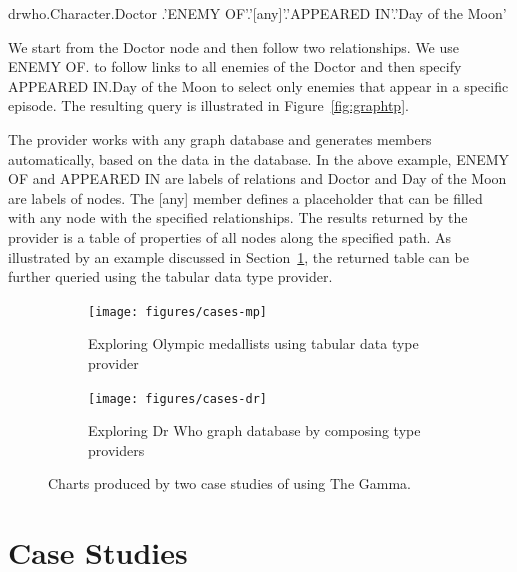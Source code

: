 \documentclass[manuscript,review,anonymous]{acmart}
\newcommand{\ikvd}[1]{{\fontfamily{zi4}\selectfont\small #1}}
\begin{document}
\begin{thegamma}
drwho.Character.Doctor
  .'ENEMY OF'.'[any]'.'APPEARED IN'.'Day of the Moon'
\end{thegamma}

\noindent
We start from the \ikvd{Doctor} node and then follow two relationships. We use
\ikvd{\textquotesingle ENEMY OF\textquotesingle.\textquotesingle [any]\textquotesingle}
to follow links to all enemies of the Doctor and then specify
\ikvd{\textquotesingle APPEARED IN\textquotesingle.\textquotesingle Day of the Moon\textquotesingle}
to select only enemies that appear in a specific episode. The resulting query
is illustrated in Figure~\ref{fig:graphtp}.

The provider works with any graph database and generates members automatically, based on the
data in the database. In the above example, \ikvd{ENEMY OF} and \ikvd{APPEARED IN} are labels
of relations and \ikvd{Doctor} and \ikvd{Day of the Moon} are labels of nodes. The
\ikvd{[any]} member defines a placeholder that can be filled with any node with the specified
relationships. The results returned by the provider is a table of properties of all nodes
along the specified path. As illustrated by an example discussed in Section~\ref{sec:cases},
the returned table can be further queried using the tabular data type provider.

\begin{figure}[b]
\centering
\begin{subfigure}[b]{0.49\textwidth}
  \centering
  \texttt{[image: figures/cases-mp]}
  \caption{Exploring Olympic medallists using tabular data type provider}
  \label{fig:cases-mp}
\end{subfigure}
\hfill
\begin{subfigure}[b]{0.49\textwidth}
  \centering
  \texttt{[image: figures/cases-dr]}
  \caption{Exploring Dr Who graph database by composing type providers}
  \label{fig:cases-dr}
\end{subfigure}
\vspace{-0.5em}
\caption{Charts produced by two case studies of using The Gamma.}
\label{fig:cases}
\end{figure}


\section{Case Studies}
\label{sec:cases}
\end{document}

